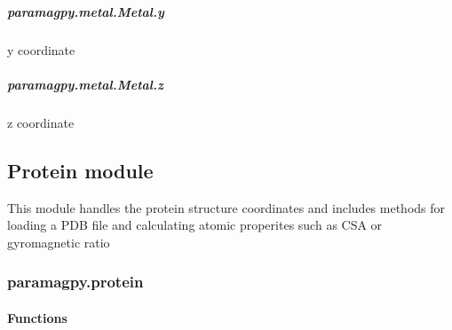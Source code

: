 \documentclass[a4paper,10pt,english]{sphinxmanual}
\begin{document}
\begin{fulllineitems}
\begin{fulllineitems}
\subparagraph{paramagpy.metal.Metal.y}
\label{\detokenize{reference/generated/paramagpy.metal.Metal.y:paramagpy-metal-metal-y}}\label{\detokenize{reference/generated/paramagpy.metal.Metal.y::doc}}

\begin{fulllineitems}
\label{\detokenize{reference/generated/paramagpy.metal.Metal.y:paramagpy.metal.Metal.y}}
y coordinate

\end{fulllineitems}



\subparagraph{paramagpy.metal.Metal.z}
\label{\detokenize{reference/generated/paramagpy.metal.Metal.z:paramagpy-metal-metal-z}}\label{\detokenize{reference/generated/paramagpy.metal.Metal.z::doc}}

\begin{fulllineitems}
\label{\detokenize{reference/generated/paramagpy.metal.Metal.z:paramagpy.metal.Metal.z}}
z coordinate

\end{fulllineitems}


\end{fulllineitems}


\end{fulllineitems}



\subsection{Protein module}
\label{\detokenize{reference/index:protein-module}}
This module handles the protein structure coordinates and includes methods for
loading a PDB file and calculating atomic properites such as CSA or gyromagnetic ratio


\subsubsection{paramagpy.protein}
\label{\detokenize{reference/protein:module-paramagpy.protein}}\label{\detokenize{reference/protein:paramagpy-protein}}\label{\detokenize{reference/protein:protein}}\label{\detokenize{reference/protein::doc}}

\paragraph{Functions}
\label{\detokenize{reference/protein:functions}}
\end{document}
